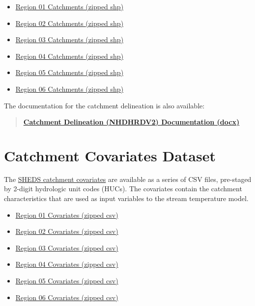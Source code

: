 \documentclass[]{book}
\providecommand{\tightlist}{%
  \setlength{\itemsep}{0pt}\setlength{\parskip}{0pt}}
\begin{document}
\begin{itemize}
\tightlist
\item
  \href{https://ecosheds.org/assets/nhdhrd/v2/spatial_01.zip}{Region 01 Catchments (zipped shp)}
\item
  \href{https://ecosheds.org/assets/nhdhrd/v2/spatial_02.zip}{Region 02 Catchments (zipped shp)}
\item
  \href{https://ecosheds.org/assets/nhdhrd/v2/spatial_03.zip}{Region 03 Catchments (zipped shp)}
\item
  \href{https://ecosheds.org/assets/nhdhrd/v2/spatial_04.zip}{Region 04 Catchments (zipped shp)}
\item
  \href{https://ecosheds.org/assets/nhdhrd/v2/spatial_05.zip}{Region 05 Catchments (zipped shp)}
\item
  \href{https://ecosheds.org/assets/nhdhrd/v2/spatial_06.zip}{Region 06 Catchments (zipped shp)}
\end{itemize}

The documentation for the catchment delineation is also available:

\begin{quote}
\textbf{\href{https://ecosheds.org/assets/nhdhrd/v2/NHDHRDV2_Documentation.docx}{Catchment Delineation (NHDHRDV2) Documentation (docx)}}
\end{quote}

\hypertarget{catchment-covariates-dataset}{%
\section{Catchment Covariates Dataset}\label{catchment-covariates-dataset}}

The \href{https://conte-ecology.github.io/shedsGisData/}{SHEDS catchment covariates} are available as a series of CSV files, pre-staged by 2-digit hydrologic unit codes (HUCs). The covariates contain the catchment characteristics that are used as input variables to the stream temperature model.

\begin{itemize}
\tightlist
\item
  \href{https://ecosheds.org/assets/nhdhrd/v2/covariates_01.zip}{Region 01 Covariates (zipped csv)}
\item
  \href{https://ecosheds.org/assets/nhdhrd/v2/covariates_02.zip}{Region 02 Covariates (zipped csv)}
\item
  \href{https://ecosheds.org/assets/nhdhrd/v2/covariates_03.zip}{Region 03 Covariates (zipped csv)}
\item
  \href{https://ecosheds.org/assets/nhdhrd/v2/covariates_04.zip}{Region 04 Covariates (zipped csv)}
\item
  \href{https://ecosheds.org/assets/nhdhrd/v2/covariates_05.zip}{Region 05 Covariates (zipped csv)}
\item
  \href{https://ecosheds.org/assets/nhdhrd/v2/covariates_06.zip}{Region 06 Covariates (zipped csv)}
\end{itemize}
\end{document}
